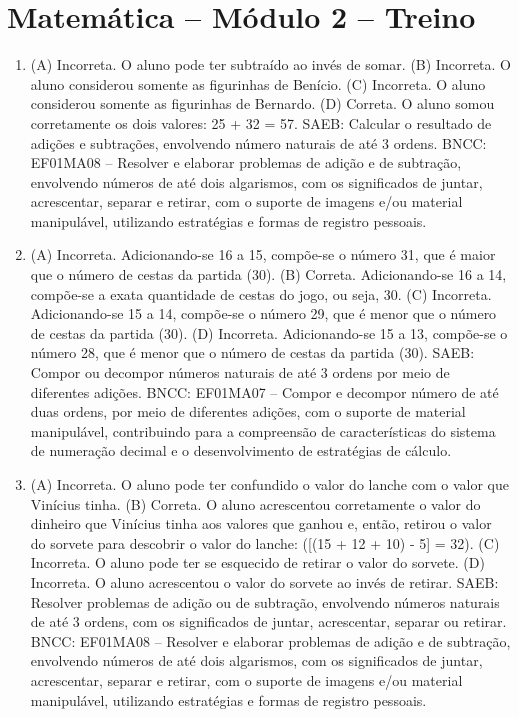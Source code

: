 \section*{Matemática – Módulo 2 – Treino}

\begin{enumerate}
\item
(A)  Incorreta. O aluno pode ter subtraído ao invés de somar.
(B)  Incorreta. O aluno considerou somente as figurinhas de Benício.
(C)  Incorreta. O aluno considerou somente as figurinhas de Bernardo.
(D)  Correta. O aluno somou corretamente os dois valores: 25 + 32 = 57.
SAEB: Calcular o resultado de adições e subtrações, envolvendo
número naturais de até 3 ordens.
BNCC: EF01MA08 -- Resolver e elaborar problemas de adição e de subtração,
envolvendo números de até dois algarismos, com os significados de juntar, acrescentar, separar e retirar, com o suporte de imagens e/ou material manipulável, utilizando estratégias e formas de registro pessoais.

\item
(A) Incorreta. Adicionando-se 16 a 15, compõe-se o número 31, que é maior que o número de cestas da partida (30).
(B) Correta. Adicionando-se 16 a 14, compõe-se a exata quantidade de cestas do jogo, ou seja, 30.
(C) Incorreta. Adicionando-se 15 a 14, compõe-se o número 29, que é menor que o número de cestas da partida (30).
(D) Incorreta. Adicionando-se 15 a 13, compõe-se o número 28, que é menor que o número de cestas da partida (30).
SAEB: Compor ou decompor números naturais de até 3 ordens por
meio de diferentes adições.
BNCC: EF01MA07 -- Compor e decompor número de até duas ordens, por meio
de diferentes adições, com o suporte de material manipulável,
contribuindo para a compreensão de características do sistema de
numeração decimal e o desenvolvimento de estratégias de cálculo.

\item
(A)  Incorreta. O aluno pode ter confundido o valor do lanche com o valor
  que Vinícius tinha.
(B)  Correta. O aluno acrescentou corretamente o valor do dinheiro que Vinícius tinha
  aos valores que ganhou e, então, retirou o valor do sorvete para
  descobrir o valor do lanche: ([(15 + 12 + 10) - 5] = 32).
(C)  Incorreta. O aluno pode ter se esquecido de retirar o valor do sorvete.
(D)  Incorreta. O aluno acrescentou o valor do sorvete ao invés de retirar.
SAEB: Resolver problemas de adição ou de subtração, envolvendo
números naturais de até 3 ordens, com os significados de juntar,
acrescentar, separar ou retirar.
BNCC: EF01MA08 -- Resolver e elaborar problemas de adição e de subtração,
envolvendo números de até dois algarismos, com os significados de
juntar, acrescentar, separar e retirar, com o suporte de imagens e/ou
material manipulável, utilizando estratégias e formas de registro
pessoais.
\end{enumerate}

